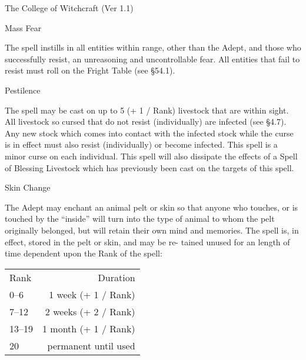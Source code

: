 \begin{Chapter}{The College of Witchcraft (Ver 1.1)}
\begin{spell}[S-15]{Mass Fear}

\begin{effects}
The spell instills in all entities within range, other than the Adept,
and those who successfully resist, an unreasoning and uncontrollable
fear.  All entities that fail to resist must roll on the Fright Table
(see §54.1).
\end{effects}
\end{spell}

\begin{spell}[S-16]{Pestilence}

\begin{effects}
The spell may be cast on up to 5 (+ 1 / Rank) livestock that are
within sight. All livestock so cursed that do not resist
(individually) are infected (see §4.7). Any new stock which comes into
contact with the infected stock while the curse is in effect must also
resist (individually) or become infected.  This spell is a minor curse
on each individual. This spell will also dissipate the effects of a
Spell of Blessing Livestock which has previously been cast on the
targets of this spell.
\end{effects}
\end{spell}

\begin{spell}[S-17]{Skin Change}

\begin{effects}
The Adept may enchant an animal pelt or skin so that anyone who
touches, or is touched by the “inside” will turn into the type of
animal to whom the pelt originally belonged, but will retain their own
mind and memories.  The spell is, in effect, stored in the pelt or
skin, and may be re- tained unused for an length of time dependent
upon the Rank of the spell:

\begin{tabularx}{\columnwidth}{lr}
Rank	& Duration \\
0--6	& 1 week (+ 1 / Rank) \\
7--12	& 2 weeks (+ 2 / Rank) \\
13–19	& 1 month (+ 1 / Rank) \\
20	& permanent until used \\
\end{tabularx}


\end{effects}
\end{spell}
\end{Chapter}
